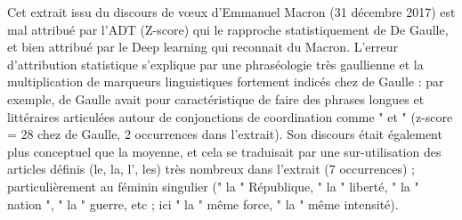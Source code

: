 Cet extrait issu du discours de vœux d'Emmanuel Macron (31 décembre 2017) est mal attribué par l'ADT (Z-score) qui le rapproche statistiquement de De Gaulle, et bien attribué par le Deep learning qui reconnait du Macron.
L'erreur d'attribution statistique s'explique par une phraséologie très gaullienne et la multiplication de marqueurs linguistiques fortement indicés chez de Gaulle : par exemple, de Gaulle avait pour caractéristique de faire des phrases longues et littéraires articulées autour de conjonctions de coordination  comme " et " (z-score = 28 chez de Gaulle, 2 occurrences dans l'extrait). Son discours était également plus conceptuel que la moyenne, et cela se traduisait par une sur-utilisation des articles définis (le, la, l', les) très nombreux dans  l'extrait (7 occurrences) ; particulièrement au féminin singulier (" la " République, " la " liberté, " la " nation ", " la " guerre, etc ; ici " la " même force, " la " même intensité).

